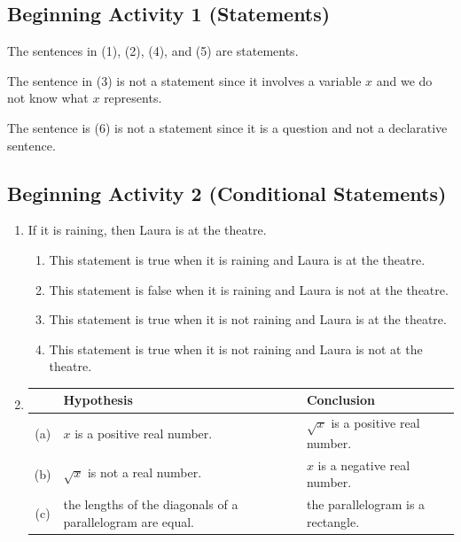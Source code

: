 \documentclass[11pt]{article}
\begin{document}
\subsection*{Beginning Activity 1 (Statements)}
The sentences in (1), (2), (4), and (5) are statements.

\noindent 
The sentence in (3) is not a statement since it involves a variable $x$ and we do not know what $x$ represents.

\noindent
The sentence is (6) is not a statement since it is a question and not a declarative sentence.
 \hbreak

\subsection*{Beginning Activity 2 (Conditional Statements)}
\begin{enumerate}
  \item If it is raining, then Laura is at the theatre. 
\begin{enumerate}
\item This statement is true when it is raining and Laura is at the theatre.
\item This statement is false when it is raining and Laura is not at the theatre.
\item This statement is true when it is not raining and Laura is at the theatre.
\item This statement is true when it is not raining and Laura is not at the theatre.
\end{enumerate}

\item \begin{tabular}[t]{| c | p{2.0in} | p{2.0in} |} \hline
  &  Hypothesis  &  Conclusion \\ \hline
(a) & $x$ is a positive real number. & $\sqrt{x}$ is a positive real number.  \\  \hline
(b) & $\sqrt{x}$ is not a real number. & $x$ is a negative real number. \\ \hline
(c) & the lengths of the diagonals of a parallelogram are equal. & the parallelogram is a rectangle. \\ \hline
\end{tabular}

\end{enumerate}
\hbreak
\end{document}
